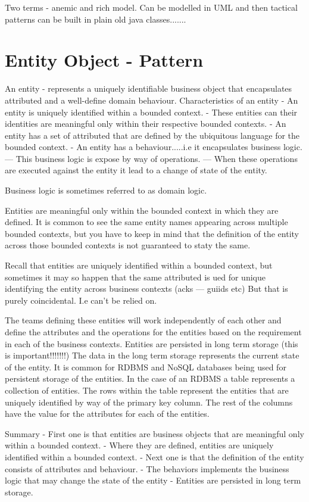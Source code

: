 Two terms - anemic and rich model.
Can be modelled in UML and then tactical patterns can be built in plain old java classes.......

\section{Entity Object - Pattern}

An entity - represents a uniquely identifiable business object that encapsulates attributed and a well-define domain behaviour.
Characteristics of an entity
- An entity is uniquely identified within a bounded context.
- These entities can their identities are meaningful only within their respective bounded contexts.
- An entity has a set of attributed that are defined by the ubiquitous language for the bounded context.
- An entity has a behaviour.....i.e it encapsulates business logic.
--- This business logic is expose by way of operations.
--- When these operations are executed against the entity it lead to a change of state of the entity.

Business logic is sometimes referred to as domain logic.

Entities are meaningful only within the bounded context in which they are defined.
It is common to see the same entity names appearing across multiple bounded contexts, but you have to keep in mind that the definition of the entity across those bounded contexts is not guaranteed to staty the same.

Recall that entities are uniquely identified within a bounded context, but sometimes it may so happen that the same attributed is ued for unique identifying the entity across business contexts (acks --- guiids etc)
But that is purely coincidental. I.e can't be relied on.

The teams defining these entities will work independently of each other and define the attributes and the operations for the entities based on the requirement in each of the business contexts.
Entities are persisted in long term storage (this is important!!!!!!!)
The data in the long term storage represents the current state of the entity.
It is common for RDBMS and NoSQL databases being used for persistent storage of the entities.
In the case of an RDBMS a table represents a collection of entities.
The rows within the table represent the entities that are uniquely identified by way of the primary key column.
The rest of the columns have the value for the attributes for each of the entities.

Summary
- First one is that entities are business objects that are meaningful only within a bounded context.
- Where they are defined, entities are uniquely identified within a bounded context.
- Next one is that the definition of the entity consists of attributes and behaviour.
- The behaviors implements the business logic that may change the state of the entity
- Entities are persisted in long term storage.


